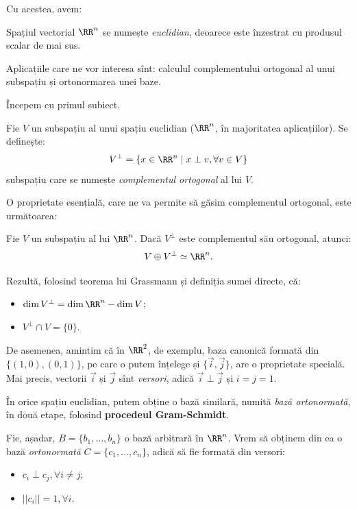 Cu acestea, avem:
\begin{definition}\label{def:sp-eucl}
  Spațiul vectorial $ \RR^n $ se numește \emph{euclidian}, deoarece este
  înzestrat cu produsul scalar de mai sus.
\end{definition}

Aplicațiile care ne vor interesa sînt: calculul complementului
ortogonal al unui subspațiu și ortonormarea unei baze.

Începem cu primul subiect.

\begin{definition}\label{def:compl-ort}
  Fie $ V $ un subspațiu al unui spațiu euclidian ($ \RR^n $, în majoritatea
  aplicațiilor). Se definește:
  \[
    V^\perp = \{ x \in \RR^n \mid x \perp v, \forall v \in V \}
  \]
  subspațiu care se numește \emph{complementul ortogonal} al lui $ V $.
\end{definition}

O proprietate esențială, care ne va permite să găsim complementul ortogonal, este
următoarea:
\begin{theorem}\label{thm:compl-ort}
  Fie $ V $ un subspațiu al lui $ \RR^n $. Dacă $ V^\perp $ este complementul
  său ortogonal, atunci:
  \[
    V \oplus V^\perp \simeq \RR^n.
  \]
\end{theorem}

Rezultă, folosind teorema lui Grassmann și definiția sumei directe, că:
\begin{itemize}
\item $ \dim V^\perp = \dim \RR^n - \dim V $;
\item $ V^\perp \cap V = \{ 0 \} $.
\end{itemize}

De asemenea, amintim că în $ \RR^2 $, de exemplu, baza canonică formată
din $ \{(1, 0), (0, 1)\} $, pe care o putem înțelege și $ \{ \vec{i}, \vec{j} \} $,
are o proprietate specială. Mai precis, vectorii $ \vec{i} $ și $ \vec{j} $
sînt \emph{versori}, adică $ \vec{i} \perp \vec{j} $ și $ i = j = 1 $.

În orice spațiu euclidian, putem obține o bază similară, numită \emph{bază %
  ortonormată}, în două etape, folosind \textbf{procedeul Gram-Schmidt}.

Fie, așadar, $ B = \{ b_1, \dots, b_n \} $ o bază arbitrară în $ \RR^n $.
Vrem să obținem din ea o bază \emph{ortonormată} $ C = \{ c_1, \dots, c_n \} $,
adică să fie formată din versori:
\begin{itemize}
\item $ c_i \perp c_j, \forall i \neq j $;
\item $ || c_i || = 1, \forall i $.
\end{itemize}


